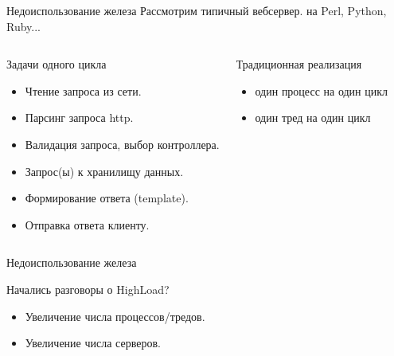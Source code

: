 \documentclass[aspectratio=169]{beamer}
\begin{document}
\begin{frame}{Недоиспользование железа}
    Рассмотрим типичный вебсервер.
    \pause на Perl\pause, Python\pause, Ruby\pause...

    \begin{columns}
        \begin{block}{Задачи одного цикла}
            \begin{itemize}
                \pause
                \item Чтение запроса из сети.

                \pause
                \item Парсинг запроса http.

                \pause
                \item Валидация запроса, выбор контроллера.

                \pause
                \item Запрос(ы) к хранилищу данных.

                \pause
                \item Формирование ответа (template).

                \pause
                \item Отправка ответа клиенту.
            \end{itemize}
        \end{block}

        \pause
        \begin{block}{Традиционная реализация}
            \begin{itemize}
                \pause
                \item один процесс на один цикл
                
                \pause
                \item один тред на один цикл
            \end{itemize}

        \end{block}
    \end{columns}
\end{frame}


\begin{frame}{Недоиспользование железа}
    \begin{block}{Начались разговоры о HighLoad?}
        \begin{itemize}
            \pause
            \item Увеличение числа процессов/тредов.
            
            \pause
            \item Увеличение числа серверов.
        \end{itemize}
    \end{block}
\end{frame}
\end{document}
